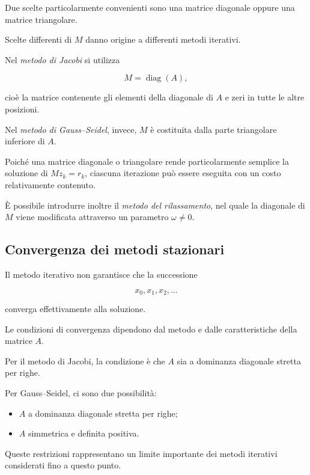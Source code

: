 Due scelte particolarmente convenienti sono una matrice diagonale
oppure una matrice triangolare.

Scelte differenti di $M$ danno origine a differenti metodi
iterativi.

Nel \emph{metodo di Jacobi} si utilizza

\begin{equation*}
    M=\operatorname{diag}(A),
\end{equation*}

cioè la matrice contenente gli elementi della diagonale di $A$ e
zeri in tutte le altre posizioni.

Nel \emph{metodo di Gauss--Seidel}, invece, $M$ è costituita dalla
parte triangolare inferiore di $A$.

Poiché una matrice diagonale o triangolare rende particolarmente
semplice la soluzione di $Mz_k=r_k$, ciascuna iterazione può essere
eseguita con un costo relativamente contenuto.

\`E possibile introdurre inoltre il \emph{metodo del rilassamento},
nel quale la diagonale di $M$ viene modificata attraverso un
parametro $\omega\neq0$.


\subsection{Convergenza dei metodi stazionari}

Il metodo iterativo non garantisce che la
successione

\begin{equation*}
    x_0,x_1,x_2,\ldots
\end{equation*}

converga effettivamente alla soluzione.

Le condizioni di convergenza dipendono dal metodo e dalle
caratteristiche della matrice $A$.

Per il metodo di Jacobi, la condizione è
che $A$ sia a dominanza diagonale stretta per righe.

Per Gauss--Seidel, ci sono due possibilità:

\begin{itemize}
    \item $A$ a dominanza diagonale stretta per righe;
    \item $A$ simmetrica e definita positiva.
\end{itemize}

Queste restrizioni rappresentano un limite importante dei metodi
iterativi considerati fino a questo punto.


